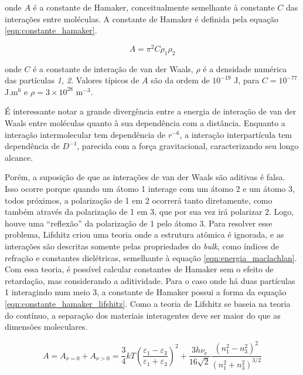 	\noindent onde \(A\) é a constante de Hamaker, conceitualmente semelhante à constante \(C\) das interações entre moléculas. A constante de Hamaker é  definida pela equação \ref{eqn:constante_hamaker}. 
	
	\begin{equation}
		A = \pi^2 C \rho_1 \rho_2
		\label{eqn:constante_hamaker}
	\end{equation}
	
	\noindent onde \(C\) é a constante de interação de van der Waals, \(\rho\) é a densidade numérica das partículas \emph{1, 2}. Valores típicos de \(A\) são da ordem de \(10^{-19}\) J, para \(C = 10^{-77}\) J.m\(^6\) e \(\rho=3 \times 10^{28}\) m\(^{-3}\).
	
	É interessante notar a grande divergência entre a energia de interação de van der Waals entre moléculas quanto à sua dependência com a distância. Enquanto a interação intermolecular tem dependência de \(r^{-6}\), a interação interpartícula tem dependência de \(D^{-1}\), parecida com a força gravitacional, caracterizando seu longo alcance.
	
	Porém, a suposição de que as interações de van der Waals são aditivas é falsa. Isso ocorre porque quando um átomo 1 interage com um átomo 2 e um átomo 3, todos próximos, a polarização de 1 em 2 ocorrerá tanto diretamente, como também através da polarização de 1 em 3, que por sua vez irá polarizar 2. Logo, houve uma ``reflexão'' da polarização de 1 pelo átomo 3. Para resolver esse problema, Lifshitz  criou uma teoria onde a estrutura atômica é ignorada, e as interações são descritas somente pelas propriedades do \emph{bulk}, como índices de refração e constantes dielétricas, semelhante à equação \ref{eqn:energia_maclachlan}. Com essa teoria, é possível calcular constantes de Hamaker sem o efeito de retardação, mas considerando a aditividade. Para o caso onde há duas partículas 1 interagindo num meio 3, a constante de Hamaker possui a forma da equação \ref{eqn:constante_hamaker_lifshitz}. Como a teoria de Lifshitz se baseia na teoria do contínuo, a separação dos materiais interagentes deve ser maior do que as dimensões moleculares.
	
	\begin{equation}
	A = A_{\nu=0} + A_{\nu>0}  = \frac{3}{4} kT \left( \frac { \varepsilon_{1}-\varepsilon_{3}} { \varepsilon_{1} + \varepsilon_{3} } \right)^{2} + \frac{3h\nu_{\mathrm{e} } } {16\sqrt{2}} \frac{\left(n_{1}^{2} - n_{3}^{2} \right)^{2}} {\left(n_{1}^{2} + n_{3}^{2} \right)^{3/2} }
	\label{eqn:constante_hamaker_lifshitz}
	\end{equation} 
	
